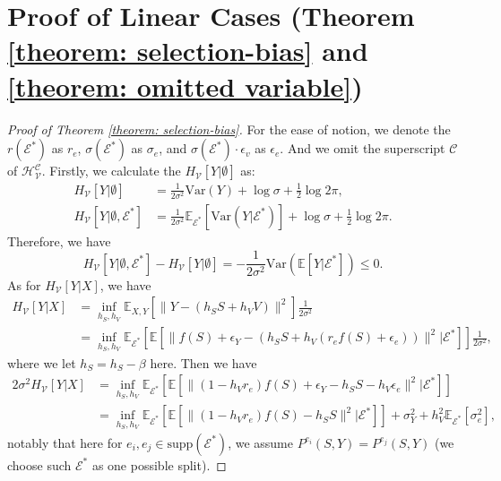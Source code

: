 \section{Proof of Linear Cases (Theorem \ref{theorem: selection-bias} and \ref{theorem: omitted variable})}
\label{proof: linear}
\begin{proof}[Proof of Theorem \ref{theorem: selection-bias}]

For the ease of notion, we denote the $r(\mathcal{E}^*)$ as $r_e$, $\sigma(\mathcal{E}^*)$ as $\sigma_e$, and $\sigma(\mathcal{E}^*)\cdot\epsilon_v$ as $\epsilon_e$. 
And we omit the superscript $\mathcal C$ of $\mathcal{H}_{\mathcal V}^{\mathcal C}$.
	Firstly, we calculate the $H_{\mathcal{V}}[Y|\emptyset]$ as:
	\begin{align}
		H_{\mathcal{V}}[Y|\emptyset] &= \frac{1}{2\sigma^2}\text{Var}(Y) + \log\sigma + \frac{1}{2}\log 2\pi,\\
		H_{\mathcal{V}}[Y|\emptyset,\mathcal{E}^*] &= \frac{1}{2\sigma^2} \mathbb{E}_{\mathcal{E}^*}[\text{Var}(Y|\mathcal{E}^*)]+ \log\sigma + \frac{1}{2}\log 2\pi.
	\end{align}
	Therefore, we have
	\begin{equation}
		H_{\mathcal{V}}[Y|\emptyset,\mathcal{E}^*] - H_{\mathcal{V}}[Y|\emptyset] = -\frac{1}{2\sigma^2}\text{Var}(\mathbb{E}[Y|\mathcal{E}^*])\leq 0.
	\end{equation}
	As for $H_{\mathcal{V}}[Y|X]$, we have
	\begin{align}
		H_{\mathcal{V}}[Y|X] &= \inf_{h_S,h_V}\mathbb{E}_{X,Y}\left[\|Y-(h_SS+h_VV)\|^2\right]\frac{1}{2\sigma^2}\\
		&= \inf_{h_S,h_V}\mathbb{E}_{\mathcal{E}^*}\left[\mathbb{E}[\|f(S)+\epsilon_Y-(h_SS+h_V(r_ef(S)+\epsilon_e))\|^2|\mathcal{E}^*]\right]\frac{1}{2\sigma^2},
	\end{align}
	where we let $h_S=h_S-\beta$ here.
	Then we have
	\begin{align}
	2\sigma^2 H_{\mathcal{V}}[Y|X] &= \inf_{h_S,h_V}\mathbb{E}_{\mathcal{E}^*}\left[\mathbb{E}[\|(1-h_Vr_e)f(S)+\epsilon_Y-h_SS-h_V\epsilon_e\|^2|\mathcal{E}^*]\right]\\
		&= \inf_{h_S,h_V}\mathbb{E}_{\mathcal{E}^*}\left[\mathbb{E}[\|(1-h_Vr_e)f(S)-h_SS\|^2|\mathcal{E}^*]\right] + \sigma_Y^2 + h_V^2\mathbb{E}_{\mathcal{E}^*}[\sigma_e^2],
	\end{align}
	notably that here for $e_i,e_j\in\text{supp}(\mathcal{E}^*)$, we assume $P^{e_i}(S,Y)=P^{e_j}(S,Y)$ (we choose such $\mathcal{E}^*$ as one possible split).

\end{proof}

